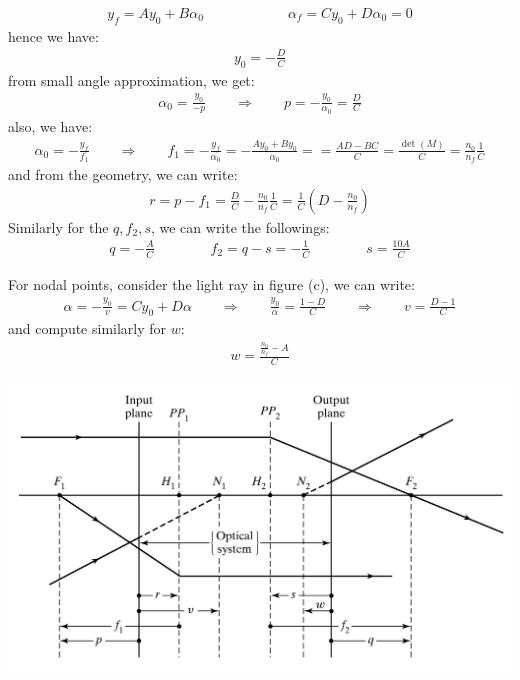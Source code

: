 \documentclass[11pt]{book}
\theoremstyle{break}
\theoremstyle{break}
\begin{document}
\begin{align*}
y_f = Ay_0 + B\alpha_0 \qquad\qquad\qquad \alpha_f = Cy_0 + D\alpha_0 = 0
\end{align*}
hence we have:
\begin{align*}
y_0 = -\frac{D}{C}
\end{align*}
from small angle approximation, we get:
\begin{align*}
\alpha_0 = \frac{y_0}{-p} \qquad \Rightarrow \qquad p = -\frac{y_0}{\alpha_0} = \frac{D}{C}
\end{align*}
also, we have:
\begin{align*}
\alpha_0 = -\frac{y_f}{f_1} \qquad \Rightarrow \qquad f_1 = -\frac{y_f}{\alpha_0} = - \frac{Ay_0 +By_0}{\alpha_0} = = \frac{AD - BC}{C} = \frac{\det(M)}{C} = \frac{n_0}{n_f} \frac{1}{C}
\end{align*}
and from the geometry, we can write:
\begin{align*}
r = p-f_1 = \frac{D}{C} - \frac{n_0}{n_f} \frac{1}{C} = \frac{1}{C} \left( D - \frac{n_0}{n_f}\right)
\end{align*}
Similarly for the $q, f_2, s$, we can write the followings:
\begin{align*}
q = -\frac{A}{C} \qquad\qquad f_2 = q-s = -\frac{1}{C} \qquad\qquad s=\frac{10A}{C}
\end{align*}

For nodal points, consider the light ray in figure (c), we can write:
\begin{align*}
\alpha = -\frac{y_0}{v} = Cy_0 + D\alpha \qquad \Rightarrow \qquad \frac{y_0}{\alpha} = \frac{1-D}{C} \qquad \Rightarrow \qquad v=\frac{D-1}{C}
\end{align*}
and compute similarly for $w$:
\begin{align*}
w = \frac{\frac{n_0}{n_f}-A}{C}
\end{align*}

\begin{center}
\includegraphics[scale=0.35]{oneCP.png}
\end{center}
\end{document}
